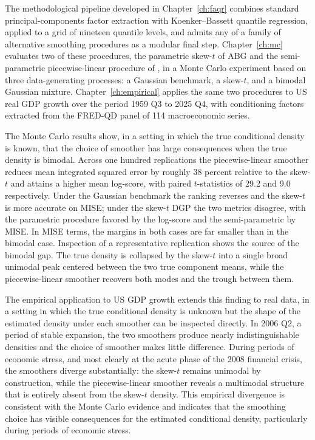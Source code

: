\documentclass[12pt]{report} %
\begin{document}
The methodological pipeline developed in Chapter~\ref{ch:faqr} combines standard principal-components factor extraction with Koenker–Bassett quantile regression, applied to a grid of nineteen quantile levels, and admits any of a family of alternative smoothing procedures as a modular final step. Chapter~\ref{ch:mc} evaluates two of these procedures, the parametric skew-$t$ of ABG and the semi-parametric piecewise-linear procedure of \textcite{mitchell2024constructing}, in a Monte Carlo experiment based on three data-generating processes: a Gaussian benchmark, a skew-$t$, and a bimodal Gaussian mixture. Chapter~\ref{ch:empirical} applies the same two procedures to US real GDP growth over the period 1959 Q3 to 2025 Q4, with conditioning factors extracted from the FRED-QD panel of 114 macroeconomic series.

The Monte Carlo results show, in a setting in which the true conditional density is known, that the choice of smoother has large consequences when the true density is bimodal. Across one hundred replications the piecewise-linear smoother reduces mean integrated squared error by roughly 38 percent relative to the skew-$t$ and attains a higher mean log-score, with paired $t$-statistics of 29.2 and 9.0 respectively. Under the Gaussian benchmark the ranking reverses and the skew-$t$ is more accurate on MISE; under the skew-$t$ DGP the two metrics disagree, with the parametric procedure favored by the log-score and the semi-parametric by MISE. In MISE terms, the margins in both cases are far smaller than in the bimodal case. Inspection of a representative replication shows the source of the bimodal gap. The true density is collapsed by the skew-$t$ into a single broad unimodal peak centered between the two true component means, while the piecewise-linear smoother recovers both modes and the trough between them.

The empirical application to US GDP growth extends this finding to real data, in a setting in which the true conditional density is unknown but the shape of the estimated density under each smoother can be inspected directly. In 2006 Q2, a period of stable expansion, the two smoothers produce nearly indistinguishable densities and the choice of smoother makes little difference. During periods of economic stress, and most clearly at the acute phase of the 2008 financial crisis, the smoothers diverge substantially: the skew-$t$ remains unimodal by construction, while the piecewise-linear smoother reveals a multimodal structure that is entirely absent from the skew-$t$ density. This empirical divergence is consistent with the Monte Carlo evidence and indicates that the smoothing choice has visible consequences for the estimated conditional density, particularly during periods of economic stress.
\end{document}
